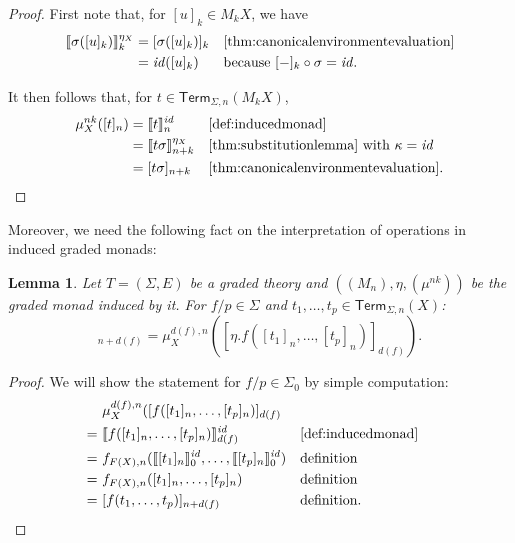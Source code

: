 \documentclass[11pt,a4paper]{amsart}
\newtheorem{lemma}[lemma]{Lemma}
\newcommand{\Term}{\mathsf{Term}}
\newcommand{\sig}{\Sigma}
\newcommand{\sigp}{\Sigma_0}
\theoremstyle{plain}
\newcommand{\id}{\mathit{id}}
\numberwithin{equation}{section}
\newcommand{\+}[1]{\mathcal{#1}\xspace}
\theoremstyle{definition}
\begin{document}
\begin{proof}
    First note that, for \([u]_k \in M_k X\), we have
    \begin{align*}
        \llbracket \sigma([u]_k) \rrbracket^{\eta_X}_{k}
        &= [\sigma([u]_k)]_k && \text{\cref{thm:canonicalenvironmentevaluation}} \\
        &= \id([u]_k) && \text{because } [-]_k \circ \sigma = \id.
    \end{align*}

    It then follows that, for \(t \in \Term_{\sig, n}(M_k X)\),
    \begin{align*}
        \mu^{nk}_X([t]_n)
        &= \llbracket t \rrbracket^{\id}_n && \text{\cref{def:inducedmonad}} \\
        &= \llbracket t\sigma \rrbracket^{\eta_X}_{n + k} && \text{\cref{thm:substitutionlemma} with } \kappa = \id \\
        &= [t\sigma]_{n + k} && \text{\cref{thm:canonicalenvironmentevaluation}}.
    \end{align*}

\end{proof}

Moreover, we need the following fact on the interpretation of operations in
induced graded monads:

\begin{lemma}\label{thm:multiplicationwithzero}
    Let \(T = (\sig, E)\) be a graded theory and \(((M_n), \eta, (\mu^{nk}))\) be the graded monad induced by it.
    For \(f/p \in \sig\) and \(t_1, \ldots, t_p \in \Term_{\sig, n}(X)\):
    \begin{equation*}
        [\eta.f(t_1, \ldots, t_p)]_{n + d(f)} = \mu^{d(f), n}_X([\eta.f([t_1]_n, \ldots, [t_p]_n)]_{d(f)}).
    \end{equation*}
\end{lemma}

\begin{proof}
    We will show the statement for $f/p\in\sigp$ by simple computation:
    \begin{align*}
        &\mu^{d(f), n}_X([f([t_1]_n, \ldots, [t_p]_n)]_{d(f)} \\
        =~&\llbracket f([t_1]_n, \ldots, [t_p]_n) \rrbracket^\id_{d(f)} && \text{\cref{def:inducedmonad}} \\
        =~&f_{F(X), n}(\llbracket [t_1]_n \rrbracket^\id_0, \ldots, \llbracket [t_p]_n \rrbracket^\id_0) && \text{definition} \\
        =~&f_{F(X), n}([t_1]_n, \ldots, [t_p]_n) && \text{definition} \\
        =~&[f(t_1, \ldots, t_p)]_{n + d(f)} && \text{definition}.
    \end{align*}

\end{proof}
\end{document}
